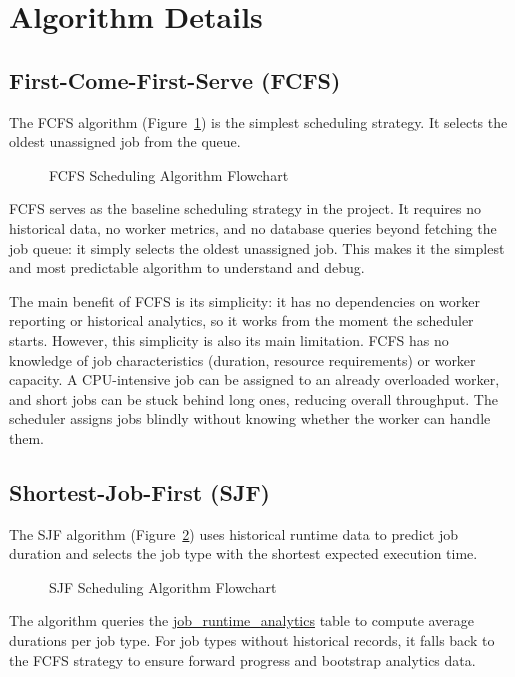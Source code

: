 \section{Algorithm Details}

\subsection{First-Come-First-Serve (FCFS)}

The FCFS algorithm (Figure~\ref{fig:fcfs-flowchart}) is the simplest scheduling strategy. It selects the oldest unassigned job from the queue.

\begin{figure}[htbp]
	\centering
	\caption{FCFS Scheduling Algorithm Flowchart}
	\label{fig:fcfs-flowchart}
\end{figure}

FCFS serves as the baseline scheduling strategy in the project. It requires no historical data, no worker metrics, and no database queries beyond fetching the job queue: it simply selects the oldest unassigned job. This makes it the simplest and most predictable algorithm to understand and debug.

The main benefit of FCFS is its simplicity: it has no dependencies on worker reporting or historical analytics, so it works from the moment the scheduler starts. However, this simplicity is also its main limitation. FCFS has no knowledge of job characteristics (duration, resource requirements) or worker capacity. A CPU-intensive job can be assigned to an already overloaded worker, and short jobs can be stuck behind long ones, reducing overall throughput. The scheduler assigns jobs blindly without knowing whether the worker can handle them.

\subsection{Shortest-Job-First (SJF)}

The SJF algorithm (Figure~\ref{fig:sjf-flowchart}) uses historical runtime data to predict job duration and selects the job type with the shortest expected execution time.

\begin{figure}[htbp]
	\centering
	\caption{SJF Scheduling Algorithm Flowchart}
	\label{fig:sjf-flowchart}
\end{figure}

The algorithm queries the \url{job_runtime_analytics} table to compute average durations per job type. For job types without historical records, it falls back to the FCFS strategy to ensure forward progress and bootstrap analytics data.

